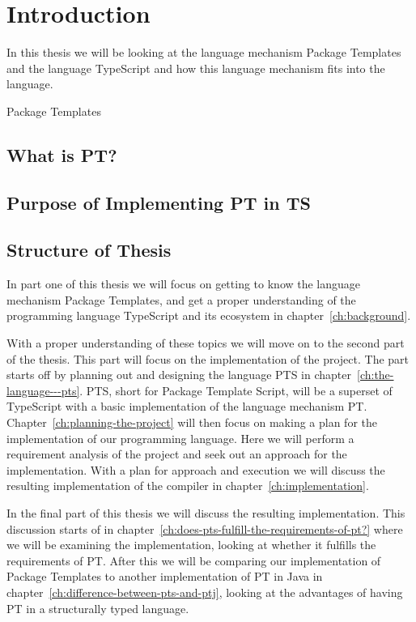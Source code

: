 
\chapter{Introduction}\label{ch:introduction}

In this thesis we will be looking at the language mechanism Package Templates and the language TypeScript and how this language mechanism fits into the language.

Package Templates

\section{What is PT?}\label{sec:what-is-pt?}


\section{Purpose of Implementing PT in TS}\label{sec:purpose-of-implementing-pt-in-ts}


\section{Structure of Thesis}\label{sec:structure-of-thesis}

In part one of this thesis we will focus on getting to know the language mechanism Package Templates, and get a proper understanding of the programming language TypeScript and its ecosystem in chapter~\vref{ch:background}.

With a proper understanding of these topics we will move on to the second part of the thesis.
This part will focus on the implementation of the project.
The part starts off by planning out and designing the language PTS in chapter~\vref{ch:the-language---pts}.
PTS, short for Package Template Script, will be a superset of TypeScript with a basic implementation of the language mechanism PT.
Chapter~\vref{ch:planning-the-project} will then focus on making a plan for the implementation of our programming language.
Here we will perform a requirement analysis of the project and seek out an approach for the implementation.
With a plan for approach and execution we will discuss the resulting implementation of the compiler in chapter~\vref{ch:implementation}.

In the final part of this thesis we will discuss the resulting implementation.
This discussion starts of in chapter~\vref{ch:does-pts-fulfill-the-requirements-of-pt?} where we will be examining the implementation, looking at whether it fulfills the requirements of PT.
After this we will be comparing our implementation of Package Templates to another implementation of PT in Java in chapter~\vref{ch:difference-between-pts-and-ptj}, looking at the advantages of having PT in a structurally typed language.
